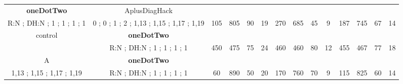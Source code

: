\begin{table}[]
{\begin{tabular}{|c|c|c|c|c|c|c|c|c|c|c|c|c|c|}
\cellcolor{blue!15}\textbf{oneDotTwo} & AplusDiagHack& {\color[HTML]{00009B} } & {\color[HTML]{9A0000} } & {\color[HTML]{009901} } &  & {\color[HTML]{00009B} } & {\color[HTML]{9A0000} } & {\color[HTML]{009901} } &  & {\color[HTML]{00009B} } & {\color[HTML]{9A0000} } & {\color[HTML]{009901} } &  \\ 
\cellcolor{ blue!15}R:N ; DH:N ; 1 ; 1 ; 1 ; 1 & 0 ; 0 ; 1 ; 2 ; 1,13 ; 1,15 ; 1,17 ; 1,19 & \multirow{-2}{*}{{\color[HTML]{00009B} 105}} & \multirow{-2}{*}{{\color[HTML]{9A0000} 805}} & \multirow{-2}{*}{{\color[HTML]{009901} 90}} & \multirow{-2}{*}{19} & \multirow{-2}{*}{{\color[HTML]{00009B} 270}} & \multirow{-2}{*}{{\color[HTML]{9A0000} 685}} & \multirow{-2}{*}{{\color[HTML]{009901} 45}} & \multirow{-2}{*}{9} & \multirow{-2}{*}{{\color[HTML]{00009B} 187}} & \multirow{-2}{*}{{\color[HTML]{9A0000} 745}} & \multirow{-2}{*}{{\color[HTML]{009901} 67}} & \multirow{-2}{*}{14} \\ \hline

control & \cellcolor{blue!15}\textbf{oneDotTwo}& {\color[HTML]{00009B} } & {\color[HTML]{9A0000} } & {\color[HTML]{009901} } &  & {\color[HTML]{00009B} } & {\color[HTML]{9A0000} } & {\color[HTML]{009901} } &  & {\color[HTML]{00009B} } & {\color[HTML]{9A0000} } & {\color[HTML]{009901} } &  \\ 
 & \cellcolor{ blue!15}R:N ; DH:N ; 1 ; 1 ; 1 ; 1 & \multirow{-2}{*}{{\color[HTML]{00009B} 450}} & \multirow{-2}{*}{{\color[HTML]{9A0000} 475}} & \multirow{-2}{*}{{\color[HTML]{009901} 75}} & \multirow{-2}{*}{24} & \multirow{-2}{*}{{\color[HTML]{00009B} 460}} & \multirow{-2}{*}{{\color[HTML]{9A0000} 460}} & \multirow{-2}{*}{{\color[HTML]{009901} 80}} & \multirow{-2}{*}{12} & \multirow{-2}{*}{{\color[HTML]{00009B} 455}} & \multirow{-2}{*}{{\color[HTML]{9A0000} 467}} & \multirow{-2}{*}{{\color[HTML]{009901} 77}} & \multirow{-2}{*}{18} \\ \hline

A & \cellcolor{blue!15}\textbf{oneDotTwo}& {\color[HTML]{00009B} } & {\color[HTML]{9A0000} } & {\color[HTML]{009901} } &  & {\color[HTML]{00009B} } & {\color[HTML]{9A0000} } & {\color[HTML]{009901} } &  & {\color[HTML]{00009B} } & {\color[HTML]{9A0000} } & {\color[HTML]{009901} } &  \\ 
1,13 ; 1,15 ; 1,17 ; 1,19 & \cellcolor{ blue!15}R:N ; DH:N ; 1 ; 1 ; 1 ; 1 & \multirow{-2}{*}{{\color[HTML]{00009B} 60}} & \multirow{-2}{*}{{\color[HTML]{9A0000} 890}} & \multirow{-2}{*}{{\color[HTML]{009901} 50}} & \multirow{-2}{*}{20} & \multirow{-2}{*}{{\color[HTML]{00009B} 170}} & \multirow{-2}{*}{{\color[HTML]{9A0000} 760}} & \multirow{-2}{*}{{\color[HTML]{009901} 70}} & \multirow{-2}{*}{9} & \multirow{-2}{*}{{\color[HTML]{00009B} 115}} & \multirow{-2}{*}{{\color[HTML]{9A0000} 825}} & \multirow{-2}{*}{{\color[HTML]{009901} 60}} & \multirow{-2}{*}{14} \\ \hline


\end{tabular}}
\end{table}

